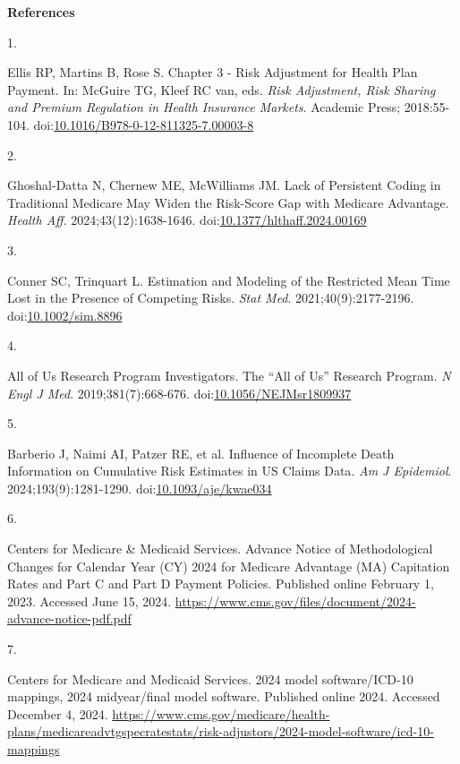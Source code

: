 \documentclass[
  12pt,
  number,
  doubleblind]{elsarticle}
\newlength{\cslhangindent}
\newlength{\csllabelwidth}
\newenvironment{CSLReferences}[2] %
 {\begin{list}{}{%
  \setlength{\itemindent}{0pt}
  \setlength{\leftmargin}{0pt}
  \setlength{\parsep}{0pt}
  \ifodd #1
   \setlength{\leftmargin}{\cslhangindent}
   \setlength{\itemindent}{-1\cslhangindent}
  \fi
  \setlength{\itemsep}{#2\baselineskip}}}
 {\end{list}}
\newcommand{\CSLLeftMargin}[1]{\parbox[t]{\csllabelwidth}{\strut#1\strut}}
\newcommand{\CSLRightInline}[1]{\parbox[t]{\linewidth - \csllabelwidth}{\strut#1\strut}}
\begin{document}
\newpage{}

\textbf{References}

\label{refs}
\begin{CSLReferences}{0}{1}
\CSLLeftMargin{1. }%
\CSLRightInline{Ellis RP, Martins B, Rose S. {Chapter 3 - Risk
Adjustment for Health Plan Payment}. In: McGuire TG, Kleef RC van, eds.
\emph{{Risk Adjustment, Risk Sharing and Premium Regulation in Health
Insurance Markets}}. Academic Press; 2018:55-104.
doi:\href{https://doi.org/10.1016/B978-0-12-811325-7.00003-8}{10.1016/B978-0-12-811325-7.00003-8}}

\CSLLeftMargin{2. }%
\CSLRightInline{Ghoshal-Datta N, Chernew ME, McWilliams JM. {Lack of
Persistent Coding in Traditional Medicare May Widen the Risk-Score Gap
with Medicare Advantage}. \emph{Health Aff}. 2024;43(12):1638-1646.
doi:\href{https://doi.org/10.1377/hlthaff.2024.00169}{10.1377/hlthaff.2024.00169}}

\CSLLeftMargin{3. }%
\CSLRightInline{Conner SC, Trinquart L. {Estimation and Modeling of the
Restricted Mean Time Lost in the Presence of Competing Risks}.
\emph{Stat Med}. 2021;40(9):2177-2196.
doi:\href{https://doi.org/10.1002/sim.8896}{10.1002/sim.8896}}

\CSLLeftMargin{4. }%
\CSLRightInline{All of Us Research Program Investigators. {The {``All of
Us''} Research Program}. \emph{N Engl J Med}. 2019;381(7):668-676.
doi:\href{https://doi.org/10.1056/NEJMsr1809937}{10.1056/NEJMsr1809937}}

\CSLLeftMargin{5. }%
\CSLRightInline{Barberio J, Naimi AI, Patzer RE, et al. {Influence of
Incomplete Death Information on Cumulative Risk Estimates in US Claims
Data}. \emph{Am J Epidemiol}. 2024;193(9):1281-1290.
doi:\href{https://doi.org/10.1093/aje/kwae034}{10.1093/aje/kwae034}}

\CSLLeftMargin{6. }%
\CSLRightInline{Centers for Medicare \& Medicaid Services. {Advance
Notice of Methodological Changes for Calendar Year (CY) 2024 for
Medicare Advantage (MA) Capitation Rates and Part C and Part D Payment
Policies}. Published online February 1, 2023. Accessed June 15, 2024.
\url{https://www.cms.gov/files/document/2024-advance-notice-pdf.pdf}}

\CSLLeftMargin{7. }%
\CSLRightInline{Centers for Medicare and Medicaid Services. 2024 model
software/{ICD}-10 mappings, 2024 midyear/final model software. Published
online 2024. Accessed December 4, 2024.
\url{https://www.cms.gov/medicare/health-plans/medicareadvtgspecratestats/risk-adjustors/2024-model-software/icd-10-mappings}}

\end{CSLReferences}
\end{document}
